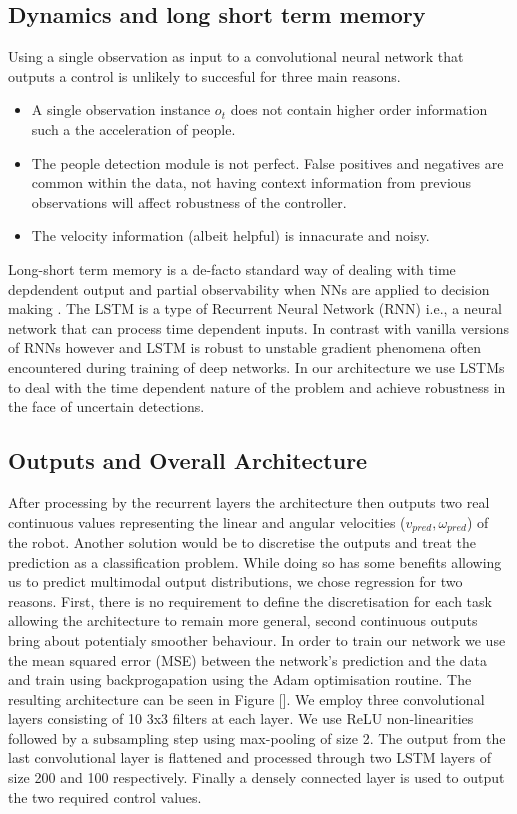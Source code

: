 \documentclass[letterpaper, 10 pt, conference]{ieeeconf}
\begin{document}
\subsection{Dynamics and long short term memory}
Using a single observation as input to a convolutional neural network that outputs a control is unlikely to succesful for three main reasons.

\begin{itemize}
\item A single observation instance $o_t$ does not contain higher order information such a the acceleration of people.
\item The people detection module is not perfect. False positives and negatives are common within the data, not having context information from previous observations will affect robustness of the controller.
\item The velocity information (albeit helpful) is innacurate and noisy.
\end{itemize}

Long-short term memory \cite{hochreiter1997long} is a de-facto standard way of dealing with time depdendent output and partial observability when NNs are applied to decision making \cite{schmidhuber2015deep}. The LSTM is a type of Recurrent Neural Network (RNN) i.e., a neural network that can process time dependent inputs. In contrast with vanilla versions of RNNs however and LSTM is robust to unstable gradient phenomena often encountered during training of deep networks. In our architecture we use LSTMs to deal with the time dependent nature of the problem and achieve robustness in the face of uncertain detections.



\subsection{Outputs and Overall Architecture}
After processing by the recurrent layers the architecture then outputs two real continuous values representing the linear and angular velocities ($v_{pred},\omega_{pred}$) of the robot. Another solution would be to discretise the outputs and treat the prediction as a classification problem. While doing so has some benefits allowing us to predict multimodal output distributions, we chose regression for two reasons. First, there is no requirement to define the discretisation for each task allowing the architecture to remain more general, second continuous outputs bring about potentialy smoother behaviour. In order to train our network we use the mean squared error (MSE) between the network's prediction and the data and train using backprogapation using the Adam \cite{kingma2014adam} optimisation routine. The resulting architecture can be seen in Figure []. We employ three convolutional layers consisting of 10 3x3 filters at each layer. We use ReLU non-linearities followed by a subsampling step using max-pooling of size 2. The output from the last convolutional layer is flattened and processed through two LSTM layers of size 200 and 100 respectively. Finally a densely connected layer is used to output the two required control values. 
 
\end{document}
